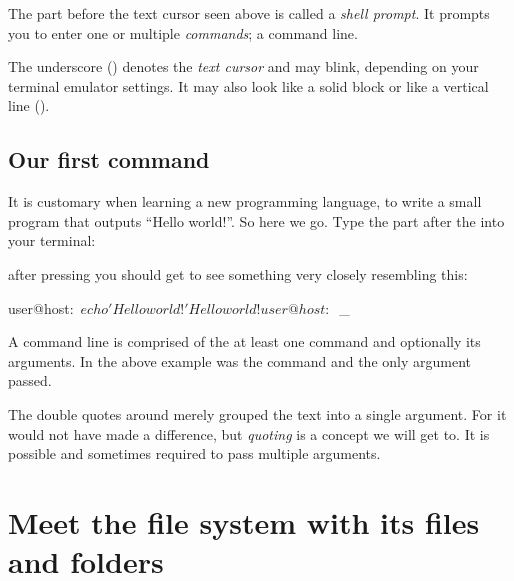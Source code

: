 \documentclass{olli-handout}
\begin{document}
\begin{hintbox}
    {\olliHandLeft} The part before the text cursor seen above is called a \emph{shell prompt}. It prompts you to enter one or multiple \emph{commands}; a command line.

    The underscore (\TTQ{\textunderscore}) denotes the \emph{text cursor} and may blink, depending on your terminal emulator settings. It may also look like a solid block or like a vertical line (\TTQ{\textbar}).
\end{hintbox}

\subsection{Our first command}

It is customary when learning a new programming language, to write a small program that outputs ``Hello world!''. So here we go. Type the part after the \TTQ{\textdollar\textvisiblespace} into your terminal:


after pressing \keys{\enter} you should get to see something very closely resembling this:

\begin{lstbash}
user@host:~$ echo 'Hello world!'
Hello world!
user@host:~$ _
\end{lstbash}

\begin{hintbox}
    {\olliPenR} A command line is comprised of the at least one command and optionally its arguments. In the above example  was the command and  the only argument passed.

    {\olliHandLeft} The double quotes around  merely grouped the text into a single argument. For  it would not have made a difference, but \emph{quoting} is a concept we will get to. It is possible and sometimes required to pass multiple arguments.
\end{hintbox}

\begin{refmanbash}
\end{refmanbash}

\section{Meet the file system with its files and folders}
\end{document}
